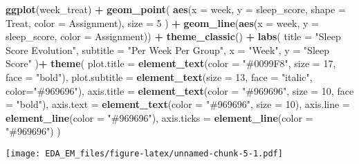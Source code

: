 \documentclass[
]{article}
\newenvironment{Shaded}{\begin{snugshade}}{\end{snugshade}}
\newcommand{\AttributeTok}[1]{\textcolor[rgb]{0.13,0.29,0.53}{#1}}
\newcommand{\DecValTok}[1]{\textcolor[rgb]{0.00,0.00,0.81}{#1}}
\newcommand{\FunctionTok}[1]{\textcolor[rgb]{0.13,0.29,0.53}{\textbf{#1}}}
\newcommand{\NormalTok}[1]{#1}
\newcommand{\SpecialCharTok}[1]{\textcolor[rgb]{0.81,0.36,0.00}{\textbf{#1}}}
\newcommand{\StringTok}[1]{\textcolor[rgb]{0.31,0.60,0.02}{#1}}
\begin{document}
\begin{Shaded}
\begin{Highlighting}[]
\FunctionTok{ggplot}\NormalTok{(week\_treat) }\SpecialCharTok{+} 
  \FunctionTok{geom\_point}\NormalTok{(}
    \FunctionTok{aes}\NormalTok{(}\AttributeTok{x =}\NormalTok{ week, }
        \AttributeTok{y =}\NormalTok{ sleep\_score,}
        \AttributeTok{shape =}\NormalTok{ Treat,}
        \AttributeTok{color =}\NormalTok{ Assignment),}
    \AttributeTok{size =} \DecValTok{5}
\NormalTok{    ) }\SpecialCharTok{+}
  \FunctionTok{geom\_line}\NormalTok{(}\FunctionTok{aes}\NormalTok{(}\AttributeTok{x =}\NormalTok{ week, }
        \AttributeTok{y =}\NormalTok{ sleep\_score,}
        \AttributeTok{color =}\NormalTok{ Assignment)) }\SpecialCharTok{+} 
  \FunctionTok{theme\_classic}\NormalTok{() }\SpecialCharTok{+}
  \FunctionTok{labs}\NormalTok{(}
    \AttributeTok{title =} \StringTok{"Sleep Score Evolution"}\NormalTok{,}
    \AttributeTok{subtitle =} \StringTok{"Per Week Per Group"}\NormalTok{,}
    \AttributeTok{x =} \StringTok{"Week"}\NormalTok{,}
    \AttributeTok{y =} \StringTok{"Sleep Score"}
\NormalTok{  )}\SpecialCharTok{+}
  \FunctionTok{theme}\NormalTok{(}
    \AttributeTok{plot.title =} \FunctionTok{element\_text}\NormalTok{(}\AttributeTok{color =} \StringTok{"\#0099F8"}\NormalTok{,}
                              \AttributeTok{size =} \DecValTok{17}\NormalTok{,}
                              \AttributeTok{face =} \StringTok{"bold"}\NormalTok{),}
    \AttributeTok{plot.subtitle =} \FunctionTok{element\_text}\NormalTok{(}\AttributeTok{size =} \DecValTok{13}\NormalTok{, }
                                 \AttributeTok{face =} \StringTok{"italic"}\NormalTok{,}
                                 \AttributeTok{color=}\StringTok{"\#969696"}\NormalTok{),}
    \AttributeTok{axis.title =} \FunctionTok{element\_text}\NormalTok{(}\AttributeTok{color =} \StringTok{"\#969696"}\NormalTok{,}
                              \AttributeTok{size =} \DecValTok{10}\NormalTok{,}
                              \AttributeTok{face =} \StringTok{"bold"}\NormalTok{),}
    \AttributeTok{axis.text =} \FunctionTok{element\_text}\NormalTok{(}\AttributeTok{color =} \StringTok{"\#969696"}\NormalTok{, }\AttributeTok{size =} \DecValTok{10}\NormalTok{),}
    \AttributeTok{axis.line =} \FunctionTok{element\_line}\NormalTok{(}\AttributeTok{color =} \StringTok{"\#969696"}\NormalTok{),}
    \AttributeTok{axis.ticks =} \FunctionTok{element\_line}\NormalTok{(}\AttributeTok{color =} \StringTok{"\#969696"}\NormalTok{)}
\NormalTok{  )}
\end{Highlighting}
\end{Shaded}

\texttt{[image: EDA\_EM\_files/figure-latex/unnamed-chunk-5-1.pdf]}
\end{document}
